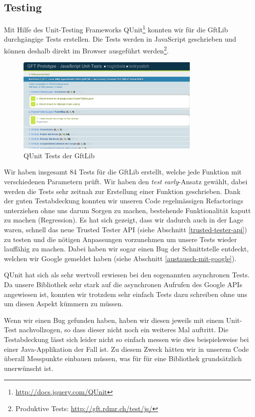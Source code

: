 \subsection{Testing}
\label{gftlib-testing}
Mit Hilfe des Unit-Testing Frameworks QUnit\footnote{\url{http://docs.jquery.com/QUnit}} konnten wir für die GftLib durchgängige Tests erstellen. Die Tests werden in JavaScript geschrieben und können deshalb direkt im Browser ausgeführt werden\footnote{Produktive Tests: \url{http://gft.rdmr.ch/test/js/}}. 

\begin{figure}[!ht]
	\centering
	\includegraphics[width=0.8\textwidth]{images/gftlib-js/gftlibjs-tests}
	\caption{QUnit Tests der GftLib}
	\label{gftlibjs-tests}
\end{figure}

Wir haben insgesamt 84 Tests für die GftLib erstellt, welche jede Funktion mit verschiedenen Parametern prüft. Wir haben den \emph{test early}-Ansatz gewählt, dabei werden die Tests sehr zeitnah zur Erstellung einer Funktion geschrieben. Dank der guten Testabdeckung konnten wir unseren Code regelmässigen Refactorings unterziehen ohne uns darum Sorgen zu machen, bestehende Funktionalität kaputt zu machen (Regression). Es hat sich gezeigt, dass wir dadurch auch in der Lage waren, schnell das neue Trusted Tester \gls{API} (siehe Abschnitt \ref{trusted-tester-api}) zu testen und die nötigen Anpassungen vorzunehmen um unsere Tests wieder lauffähig zu machen. Dabei haben wir sogar einen Bug der Schnittstelle entdeckt, welchen wir Google gemeldet haben (siehe Abschnitt \ref{austausch-mit-google}).

QUnit hat sich als sehr wertvoll erwiesen bei den sogenannten asynchronen Tests. Da unsere Bibliothek sehr stark auf die asynchronen Aufrufen des Google \gls{API}s angewiesen ist, konnten wir trotzdem sehr einfach Tests dazu schreiben ohne uns um diesen Aspekt kümmern zu müssen.

Wenn wir einen Bug gefunden haben, haben wir diesen jeweils mit einem Unit-Test nachvollzogen, so dass dieser nicht noch ein weiteres Mal auftritt. Die Testabdeckung lässt sich leider nicht so einfach messen wie dies beispielsweise bei einer Java-Applikation der Fall ist. Zu diesem Zweck hätten wir in unserem Code überall Messpunkte einbauen müssen, was für für eine Bibliothek grundsätzlich unerwünscht ist.

